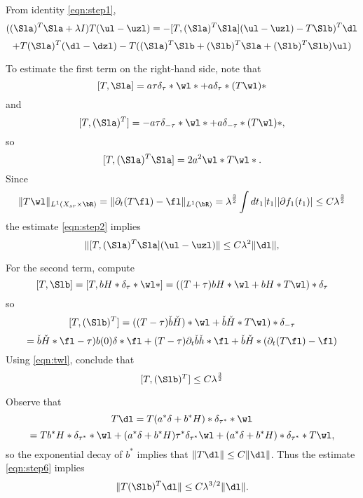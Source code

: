 From identity \ref{eqn:step1},
\[
   ((\Sla)^T\Sla + \lambda I) T(\ul-\uzl) = -[T,
   (\Sla)^T\Sla](\ul-\uzl) - T \Slb)^T \dl 
 \]
\begin{equation}
  \label{eqn:step3}
 + T (\Sla)^T(\dl-\dzl)- 
  T((\Sla)^T\Slb + (\Slb)^T\Sla + (\Slb)^T\Slb)\ul)
\end{equation}

To estimate the first term on the right-hand side, note that
\[
  [T,\Sla] = a \tau \delta_{\tau} * \wl* + a \delta_{\tau} * (T\wl)*
\]
and
\[
  [T,(\Sla)^T] = -a \tau \delta_{-\tau} * \wl* + a 
  \delta_{-\tau}*(T\wl)*,
\]
so
\[
  [T,  (\Sla)^T\Sla] = 2 a^2 \wl*T\wl*.
\]
Since
\begin{equation}
  \label{eqn:twl}
  \|T\wl\|_{L^1(X_{sr}\times \bR)} =
  \|\partial_t(T\fl)-\fl\|_{L^1(\bR)} =\lambda^{\frac{3}{2}}\int dt_1
  |t_1||\partial f_1(t_1)| \le C \lambda^{\frac{3}{2}}
\end{equation}
the estimate \ref{eqn:step2} implies
\begin{equation}
  \label{step5}
  \|[T,  (\Sla)^T\Sla](\ul-\uzl)\| \le C \lambda^{2}\|\dl\|,
\end{equation}

For the second term, compute
\[
  [T, \Slb] = [T,bH*\delta_{\tau}*\wl*] = ((T+\tau)bH*\wl
  + bH*T\wl)*\delta_{\tau}
\]
so
\[
  [T,(\Slb)^T]  =  ((T - \tau) \check{b}\check{H})*\wl
  + \check{b}\check{H}*T\wl)*\delta_{-\tau}
\]
\[
= \check{b}\check{H}*\fl
-\tau)b(0)\delta *\fl + (T-\tau)
\partial_t\check{b}\check{h}*\fl +
\check{b}\check{H}*(\partial_t(T\fl)-\fl)
\]
Using \ref{eqn:twl}, conclude that
\begin{equation}
  \label{eqn:step6}
  [T, (\Slb)^T] \le C \lambda^{\frac{3}{2}}
\end{equation}

Observe that
\[
  T\dl=T(a^*\delta + b^*H)*\delta_{\tau^*}*\wl
\]
\[
  =Tb^*H *\delta_{\tau^*}*\wl+(a^*\delta+b^*H)\tau^*\delta_{\tau^*}\wl
  +(a^*\delta + b^*H)*\delta_{\tau^*}*T\wl,
\]
so the exponential decay of $b^*$ implies that $\|T\dl\| \le
C\|\dl\|$. Thus the estimate \ref{eqn:step6} implies
\begin{equation}
  \label{eqn:step7}
  \|T(\Slb)^T\dl\| \le C \lambda^{3/2}\|\dl\|.
\end{equation}

